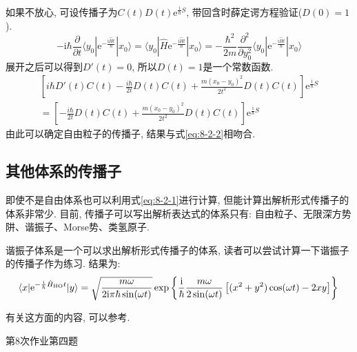         如果不放心, 可设传播子为$ C(t) D(t) \mathrm{e}^{ \frac{\mathrm{i}}{\hbar} S } $, 带回含时薛定谔方程验证($D(0) = 1$).
        \begin{equation}
            -\mathrm{i}\hbar \frac {\partial}{\partial t} \langle y_0 | \mathrm{e}^{-\frac {\mathrm{i}\hat{H}t}{\hbar}} |x_0 \rangle =  \langle y_0 | \hat{H} \mathrm{e}^{-\frac {\mathrm{i}\hat{H}t}{\hbar}} |x_0 \rangle = -\frac {\hbar^2}{2m} \frac {\partial^2}{\partial y_0^2} \langle y_0 | \mathrm{e}^{-\frac {\mathrm{i}\hat{H}t}{\hbar}} |x_0 \rangle
        \end{equation}
        展开之后可以得到$D'(t) = 0$, 所以$D(t)=1$是一个常数函数. 
        \begin{equation}\begin{aligned}
            \left[i\hbar D'(t) C(t) - \frac{i\hbar}{2t} D(t) C(t) + \frac{m(x_0-y_0)^2}{2t^2} D(t) C(t) \right] \mathrm{e}^{\frac {\mathrm{i}}{\hbar} S} \\
            = \left[- \frac{i\hbar}{2t} D(t) C(t) + \frac{m(x_0-y_0)^2}{2t^2} D(t) C(t)\right] \mathrm{e}^{\frac {\mathrm{i}}{\hbar} S}
        \end{aligned}\end{equation}
        由此可以确定自由粒子的传播子, 结果与式\ref{eq:8-2-2}相吻合. 

        \subsection{其他体系的传播子}

        即使不是自由体系也可以利用式\ref{eq:8-2-1}进行计算, 但能计算出解析形式传播子的体系非常少. 目前, 传播子可以写出解析表达式的体系只有: 自由粒子、无限深方势阱、谐振子、Morse势、类氢原子\cite{Grosche_HFPI}\cite{Kleinnert_PIQMSPP}. 

        谐振子体系是一个可以求出解析形式传播子的体系, 读者可以尝试计算一下谐振子的传播子作为练习. 结果为:
        \begin{equation}
            \langle x | \mathrm{e}^{-\frac {\mathrm{i}}{\hbar}\hat{H}_\mathrm{HO}t} | y \rangle = \sqrt{\frac{m\omega}{2\mathrm{i}\pi\hbar\sin(\omega t)}} \exp\left\{ \frac{\mathrm{i}}{\hbar} \frac{m\omega}{2\sin(\omega t)}\left[ (x^2 + y^2)\cos(\omega t) - 2xy \right] \right\} \\
        \end{equation}

        有关这方面的内容, 可以参考\cite{费曼量子力学与路径积分}\cite{谷村吉隆化学物理入门}.

        \begin{asg}
            第8次作业第四题
        \end{asg}

